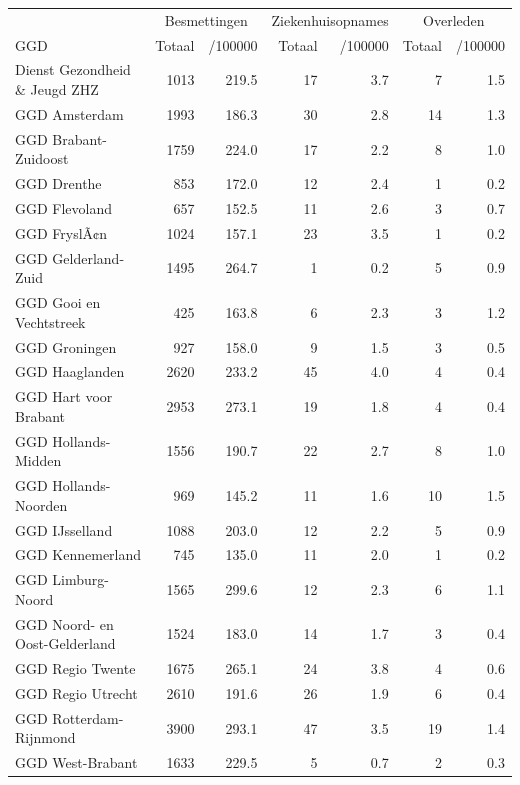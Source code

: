 \documentclass[
  english,
  man,floatsintext]{apa6}
\begin{document}
\begin{table}
\centering\begingroup\fontsize{10}{12}\selectfont

\begin{threeparttable}
\begin{tabular}{lrrrrrr}
\toprule
\multicolumn{1}{c}{ } & \multicolumn{2}{c}{Besmettingen} & \multicolumn{2}{c}{Ziekenhuisopnames} & \multicolumn{2}{c}{Overleden} \\
\cmidrule(l{3pt}r{3pt}){2-3} \cmidrule(l{3pt}r{3pt}){4-5} \cmidrule(l{3pt}r{3pt}){6-7}
GGD & Totaal & /100000 & Totaal & /100000 & Totaal & /100000\\
\midrule
Dienst Gezondheid \& Jeugd ZHZ & 1013 & 219.5 & 17 & 3.7 & 7 & 1.5\\
GGD Amsterdam & 1993 & 186.3 & 30 & 2.8 & 14 & 1.3\\
GGD Brabant-Zuidoost & 1759 & 224.0 & 17 & 2.2 & 8 & 1.0\\
GGD Drenthe & 853 & 172.0 & 12 & 2.4 & 1 & 0.2\\
GGD Flevoland & 657 & 152.5 & 11 & 2.6 & 3 & 0.7\\
GGD FryslÃ¢n & 1024 & 157.1 & 23 & 3.5 & 1 & 0.2\\
GGD Gelderland-Zuid & 1495 & 264.7 & 1 & 0.2 & 5 & 0.9\\
GGD Gooi en Vechtstreek & 425 & 163.8 & 6 & 2.3 & 3 & 1.2\\
GGD Groningen & 927 & 158.0 & 9 & 1.5 & 3 & 0.5\\
GGD Haaglanden & 2620 & 233.2 & 45 & 4.0 & 4 & 0.4\\
GGD Hart voor Brabant & 2953 & 273.1 & 19 & 1.8 & 4 & 0.4\\
GGD Hollands-Midden & 1556 & 190.7 & 22 & 2.7 & 8 & 1.0\\
GGD Hollands-Noorden & 969 & 145.2 & 11 & 1.6 & 10 & 1.5\\
GGD IJsselland & 1088 & 203.0 & 12 & 2.2 & 5 & 0.9\\
GGD Kennemerland & 745 & 135.0 & 11 & 2.0 & 1 & 0.2\\
GGD Limburg-Noord & 1565 & 299.6 & 12 & 2.3 & 6 & 1.1\\
GGD Noord- en Oost-Gelderland & 1524 & 183.0 & 14 & 1.7 & 3 & 0.4\\
GGD Regio Twente & 1675 & 265.1 & 24 & 3.8 & 4 & 0.6\\
GGD Regio Utrecht & 2610 & 191.6 & 26 & 1.9 & 6 & 0.4\\
GGD Rotterdam-Rijnmond & 3900 & 293.1 & 47 & 3.5 & 19 & 1.4\\
GGD West-Brabant & 1633 & 229.5 & 5 & 0.7 & 2 & 0.3\\

\end{tabular}
\end{threeparttable}
\end{table}
\end{document}
